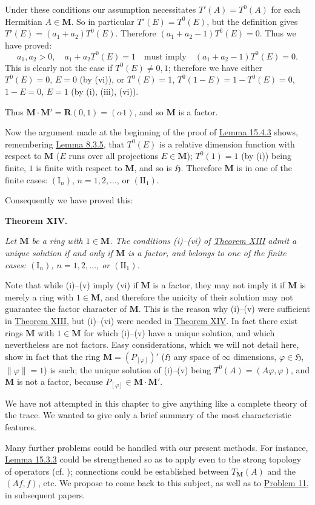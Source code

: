 \documentclass[12pt,b5paper,twoside]{article}
\newcommand{\Hspace}{\mathfrak H}
\newcommand{\M}{\mathbf M}
\newcommand{\MainTheorem}[1]{%
  \par\smallskip\noindent\phantomsection\label{thm:#1}\textbf{Theorem #1.}\enspace
}
\newcommand{\lemref}[1]{\hyperref[lem:#1]{Lemma #1}}
\newcommand{\thmref}[1]{\hyperref[thm:#1]{Theorem #1}}
\newcommand{\probref}[1]{\hyperref[prob:#1]{Problem #1}}
\begin{document}
Under these conditions our assumption necessitates \(T'(A)=T^0(A)\) for
each Hermitian \(A\in\M\). So in particular \(T'(E)=T^0(E)\), but the
definition gives \(T'(E)=(a_1+a_2)T^0(E)\). Therefore
\((a_1+a_2-1)T^0(E)=0\). Thus we have proved:
\[
a_1,a_2>0,\quad a_1+a_2T^0(E)=1
\quad\text{must imply}\quad (a_1+a_2-1)T^0(E)=0.
\]
This is clearly not the case if \(T^0(E)\ne0,1\); therefore we have either
\(T^0(E)=0\), \(E=0\) (by (vi)), or \(T^0(E)=1\),
\(T^0(1-E)=1-T^0(E)=0\), \(1-E=0\), \(E=1\) (by (i), (iii), (vi)).

Thus \(\M\cdot\M'=\mathbf R(0,1)=(\alpha1)\), and so \(\M\) is a factor.

Now the argument made at the beginning of the proof of \lemref{15.4.3}
shows, remembering \lemref{8.3.5}, that \(T^0(E)\) is a relative dimension
function with respect to \(\M\) (\(E\) runs over all projections
\(E\in\M\)); \(T^0(1)=1\) (by (i)) being finite, \(1\) is finite with
respect to \(\M\), and so is \(\Hspace\). Therefore \(\M\) is in one of the
finite cases: \((\mathrm I_n)\), \(n=1,2,\ldots\), or
\((\mathrm{II}_1)\).

Consequently we have proved this:

\MainTheorem{XIV}
{\itshape Let \(\M\) be a ring with \(1\in\M\). The conditions (i)--(vi)
of \thmref{XIII} admit a unique solution if and only if \(\M\) is a factor,
and belongs to one of the finite cases: \((\mathrm I_n)\),
\(n=1,2,\ldots\), or \((\mathrm{II}_1)\).}

Note that while (i)--(v) imply (vi) if \(\M\) is a factor, they may not
imply it if \(\M\) is merely a ring with \(1\in\M\), and therefore the
unicity of their solution may not guarantee the factor character of \(\M\).
This is the reason why (i)--(v) were sufficient in \thmref{XIII}, but
(i)--(vi) were needed in \thmref{XIV}. In fact there exist rings \(\M\) with
\(1\in\M\) for which (i)--(v) have a unique solution, and which nevertheless
are not factors. Easy considerations, which we will not detail here, show in
fact that the ring \(\M=(P_{[\varphi]})'\) (\(\Hspace\) any space of
\(\infty\) dimensions, \(\varphi\in\Hspace\), \(\lVert\varphi\rVert=1\)) is
such; the unique solution of (i)--(v) being
\(T^0(A)=(A\varphi,\varphi)\), and \(\M\) is not a factor, because
\(P_{[\varphi]}\in\M\cdot\M'\).

We have not attempted in this chapter to give anything like a complete
theory of the trace. We wanted to give only a brief summary of the most
characteristic features.

Many further problems could be handled with our present methods. For
instance, \lemref{15.3.3} could be strengthened so as to apply even to the
strong topology of operators (cf. \cite[p.~381]{ref18}); connections could
be established between \(T_{\M}(A)\) and the \((Af,f)\), etc. We propose to
come back to this subject, as well as to \probref{11}, in subsequent papers.
\end{document}
